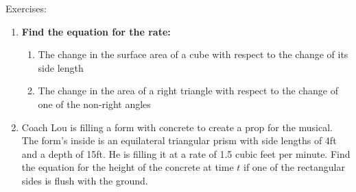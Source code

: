 \documentclass[../revisedmain.tex]{subfiles}
\begin{document}
\begin{center}
	\LARGE Exercises:
\end{center}
\begin{enumerate}
	\item \textbf{Find the equation for the rate:}
	\begin{enumerate}
		\item The change in the surface area of a cube with respect to the change of its side length
		\item The change in the area of a right triangle with respect to the change of one of the non-right angles
	\end{enumerate}
	\item Coach Lou is filling a form with concrete to create a prop for the musical. The form's inside is an equilateral triangular prism with side lengths of 4ft and a depth of 15ft. He is filling it at a rate of 1.5 cubic feet per minute. Find the equation for the height of the concrete at time $t$ if one of the rectangular sides is flush with the ground.
\end{enumerate}
\end{document}
